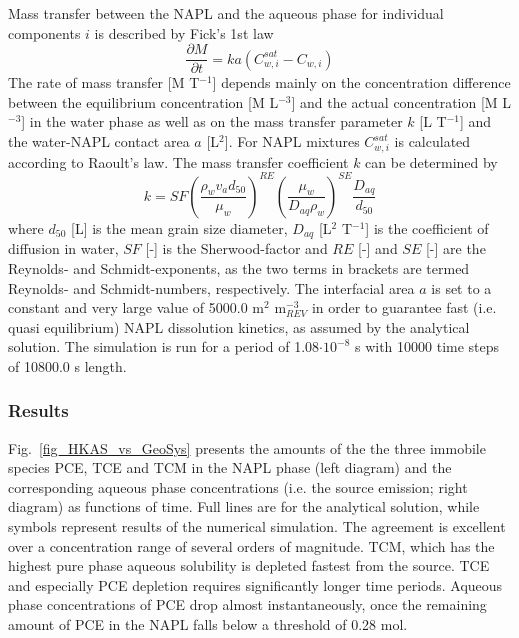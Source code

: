 Mass transfer between the NAPL and the aqueous phase for individual components $i$ is described by Fick's 1st law
\begin{equation}
    \frac{\partial M}{\partial t} =  k a \left( C_{w,i}^{sat}  -  C_{w,i}  \right)
    \label{eq_mass_transfer}
\end{equation}
The rate of mass transfer [M T$^{-1}$] depends mainly on the concentration difference between the equilibrium concentration [M L$^{-3}$] and the actual concentration [M L$^{-3}$] in the water phase as well as on the mass transfer parameter $k$ [L T$^{-1}$] and the water-NAPL contact area $a$ [L$^2$]. For NAPL mixtures $C^{sat}_{w,i}$ is calculated according to Raoult's law. The mass transfer coefficient $k$ can be determined by
 \begin{equation}
k = SF \left( \frac{\rho_w v_a d_{50}}{\mu_w}  \right)^{RE}  \left( \frac{\mu_w }{D_{aq} \rho_w}  \right)^{SE} \frac{D_{aq}}{d_{50}}
    \label{eq_mass_transfer_coefficient}
\end{equation}
where $d_{50}$ [L] is the mean grain size diameter, $D_{aq}$ [L$^2$ T$^{-1}$] is the coefficient of diffusion in water, $SF$  [-] is the Sherwood-factor and $RE$ [-] and $SE$ [-] are the Reynolds- and Schmidt-exponents, as the two terms in brackets are termed Reynolds- and Schmidt-numbers, respectively. The interfacial area $a$ is set to a constant and very large value of 5000.0 m$^2$ m$^{-3}_{REV}$ in order to guarantee fast (i.e. quasi equilibrium) NAPL dissolution kinetics, as assumed by the analytical solution. The simulation is run for a period of 1.08$\cdot10^{-8}$ s with 10000 time steps of 10800.0 s length.

\subsubsection*{Results}

Fig.~\ref{fig_HKAS_vs_GeoSys} presents the amounts of the the three immobile species PCE, TCE and TCM in the NAPL phase (left diagram) and the corresponding aqueous phase concentrations (i.e. the source emission; right diagram) as functions of time. Full lines are for the analytical solution, while symbols represent results of the numerical simulation. The agreement is excellent over a concentration range of several orders of magnitude. TCM, which has the highest pure phase aqueous solubility is depleted fastest from the source. TCE and especially PCE depletion requires significantly longer time periods. Aqueous phase concentrations of PCE drop almost instantaneously, once the remaining amount of PCE in the NAPL falls below a threshold of 0.28 mol.

